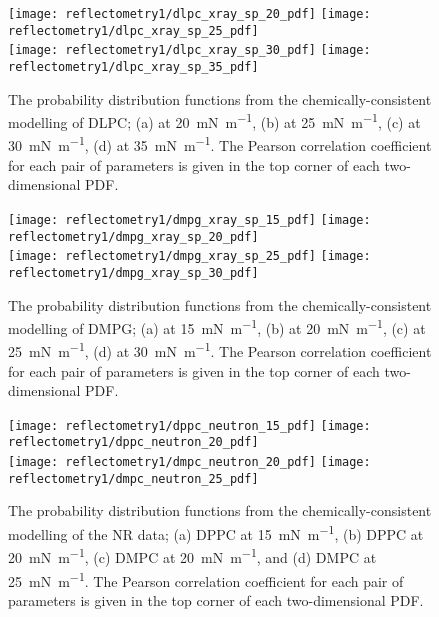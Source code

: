 \begin{figure}
    \centering
    \texttt{[image: reflectometry1/dlpc\_xray\_sp\_20\_pdf]}
    \texttt{[image: reflectometry1/dlpc\_xray\_sp\_25\_pdf]} \\
    \texttt{[image: reflectometry1/dlpc\_xray\_sp\_30\_pdf]}
    \texttt{[image: reflectometry1/dlpc\_xray\_sp\_35\_pdf]}
    \caption{The probability distribution functions from the chemically-consistent modelling of DLPC; (a) at \SI{20}{\milli\newton\per\meter}, (b) at \SI{25}{\milli\newton\per\meter}, (c) at \SI{30}{\milli\newton\per\meter}, (d) at \SI{35}{\milli\newton\per\meter}. The Pearson correlation coefficient for each pair of parameters is given in the top corner of each two-dimensional PDF.}
    \label{fig:dlpcpdfs}
\end{figure}
%
%
\begin{figure}
    \centering
    \texttt{[image: reflectometry1/dmpg\_xray\_sp\_15\_pdf]}
    \texttt{[image: reflectometry1/dmpg\_xray\_sp\_20\_pdf]} \\
    \texttt{[image: reflectometry1/dmpg\_xray\_sp\_25\_pdf]}
    \texttt{[image: reflectometry1/dmpg\_xray\_sp\_30\_pdf]}
    \caption{The probability distribution functions from the chemically-consistent modelling of DMPG; (a) at \SI{15}{\milli\newton\per\meter}, (b) at \SI{20}{\milli\newton\per\meter}, (c) at \SI{25}{\milli\newton\per\meter}, (d) at \SI{30}{\milli\newton\per\meter}. The Pearson correlation coefficient for each pair of parameters is given in the top corner of each two-dimensional PDF.}
    \label{fig:dmpgpdfs}
\end{figure}
%
%
\begin{figure}
    \centering
    \texttt{[image: reflectometry1/dppc\_neutron\_15\_pdf]}
    \texttt{[image: reflectometry1/dppc\_neutron\_20\_pdf]} \\
    \texttt{[image: reflectometry1/dmpc\_neutron\_20\_pdf]}
    \texttt{[image: reflectometry1/dmpc\_neutron\_25\_pdf]}
    \caption{The probability distribution functions from the chemically-consistent modelling of the NR data; (a) DPPC at \SI{15}{\milli\newton\per\meter}, (b) DPPC at \SI{20}{\milli\newton\per\meter}, (c) DMPC at \SI{20}{\milli\newton\per\meter}, and (d) DMPC at \SI{25}{\milli\newton\per\meter}. The Pearson correlation coefficient for each pair of parameters is given in the top corner of each two-dimensional PDF.}
    \label{fig:nrpdfs}
\end{figure}
%

